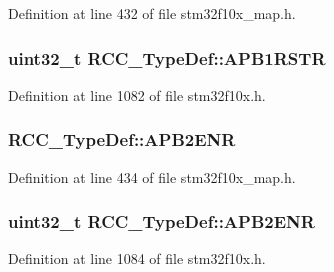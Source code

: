 Definition at line 432 of file stm32f10x\+\_\+map.\+h.

\subsubsection[{\texorpdfstring{A\+P\+B1\+R\+S\+TR}{APB1RSTR}}]{ {\bf uint32\+\_\+t} R\+C\+C\+\_\+\+Type\+Def\+::\+A\+P\+B1\+R\+S\+TR}\hypertarget{struct_r_c_c___type_def_a600f4d6d592f43edb2fc653c5cba023a}{}\label{struct_r_c_c___type_def_a600f4d6d592f43edb2fc653c5cba023a}


Definition at line 1082 of file stm32f10x.\+h.

\subsubsection[{\texorpdfstring{A\+P\+B2\+E\+NR}{APB2ENR}}]{ R\+C\+C\+\_\+\+Type\+Def\+::\+A\+P\+B2\+E\+NR}\hypertarget{struct_r_c_c___type_def_ad46d55093702bf1e044963518b86a663}{}\label{struct_r_c_c___type_def_ad46d55093702bf1e044963518b86a663}


Definition at line 434 of file stm32f10x\+\_\+map.\+h.

\subsubsection[{\texorpdfstring{A\+P\+B2\+E\+NR}{APB2ENR}}]{ {\bf uint32\+\_\+t} R\+C\+C\+\_\+\+Type\+Def\+::\+A\+P\+B2\+E\+NR}\hypertarget{struct_r_c_c___type_def_a619b4c22f630a269dfd0c331f90f6868}{}\label{struct_r_c_c___type_def_a619b4c22f630a269dfd0c331f90f6868}


Definition at line 1084 of file stm32f10x.\+h.

